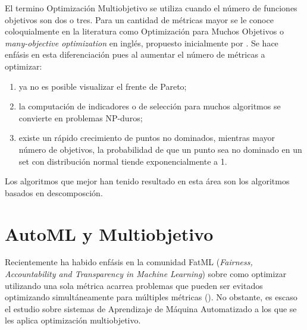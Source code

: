  El termino Optimizaci\'on Multiobjetivo se utiliza cuando el n\'umero de funciones objetivos son dos o tres. Para un cantidad de m\'etricas mayor se le conoce coloquialmente en la literatura como Optimizaci\'on para Muchos Objetivos o \textit{many-objective optimization} en ingl\'es, propuesto inicialmente por \cite{10.1007/978-3-540-31880-4_2}. Se hace enf\'asis en esta diferenciaci\'on pues al aumentar el n\'umero de m\'etricas a optimizar:
 \begin{enumerate}
     \item ya no es posible visualizar el frente de Pareto;
     \item la computaci\'on de indicadores o de selecci\'on para muchos algoritmos se convierte en problemas NP-duros;
     \item existe un r\'apido crecimiento de puntos no dominados, mientras mayor n\'umero de objetivos, la probabilidad de que un punto sea no dominado en un set con distribuci\'on normal tiende exponencialmente a 1.
 \end{enumerate}

Los algoritmos que mejor han tenido resultado en esta \'area son los algoritmos basados en descomposci\'on.


\section{AutoML y Multiobjetivo}\label{background:mooautoml}

Recientemente ha habido enf\'asis en la comunidad FatML (\textit{Fairness, Accountability and Transparency in Machine Learning}) sobre como optimizar utilizando una sola m\'etrica acarrea problemas que pueden ser evitados optimizando simult\'aneamente para m\'ultiples m\'etricas (\cite{barocas2017fairness}). No obstante, es escaso el estudio sobre sistemas de Aprendizaje de M\'aquina Automatizado a los que se les aplica optimizaci\'on multiobjetivo.

